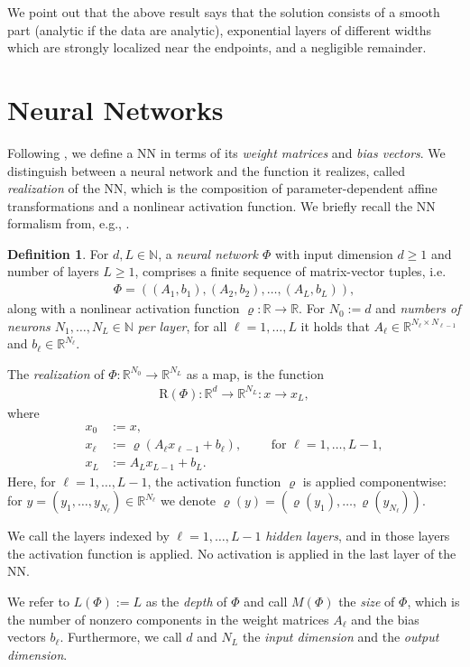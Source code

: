 \documentclass[11pt]{article}
\providecommand{\R}{\ensuremath{\mathbb{R}}}
\providecommand{\N}{\ensuremath{\mathbb{N}}}
\newcommand{\realiz}{\mathrm{R}}
\newcommand{\depth}{L}
\newcommand{\size}{M}
\theoremstyle{plain}
\theoremstyle{definition}
\newtheorem{definition}[theorem]{Definition}
\theoremstyle{remark}
\numberwithin{equation}{section}
\begin{document}
We point out that the above result says that the solution consists of a smooth part (analytic if the data are analytic), exponential layers of different widths which are strongly localized near the endpoints, and a negligible remainder. 


\section{Neural Networks}
\label{sec:nn}
Following  \cite{PV,OPS}, we define a NN in terms of its \emph{weight matrices} and \emph{bias vectors}.
We distinguish between a neural network and the function it realizes,
called \emph{realization} of the NN, which is the composition of parameter-dependent affine transformations
and a nonlinear activation function.
We briefly recall the NN formalism from, e.g., \cite{OPS}.
%

\begin{definition}
\label{def:NeuralNetworks}
For $d,L\in\N$, a \emph{neural network $\Phi$} 
with input dimension $d \geq 1$ and number of layers $L\geq 1$, 
comprises a finite sequence of matrix-vector tuples, i.e.
\begin{align*}
\Phi = ((A_1,b_1),(A_2,b_2),\ldots,(A_L,b_L)),
\end{align*}
along with a nonlinear activation function $\varrho : \mathbb{R} \rightarrow \mathbb{R}$.
%
For $N_0 := d$ and \emph{numbers of neurons $N_1,\ldots,N_L\in\N$ per layer}, 
for all $\ell=1,\ldots, L$ it holds that
$A_\ell\in\R^{N_\ell \times N_{\ell-1} }$ and
$b_\ell\in\R^{N_\ell}$.

The \emph{realization} of $\Phi:\R^{N_0} \to \R^{N_L}$ as a map, is the function
\begin{align*}
\realiz(\Phi): \R^d\to\R^{N_L} : x \to x_L,
\end{align*}
where
\begin{align*}
x_0 & := x,
\\
x_\ell & := \varrho( A_\ell x_{\ell-1} + b_\ell ),
\qquad\text{ for }\ell=1,\ldots,L-1,
\\
x_L & := A_L x_{L-1} + b_L.
\end{align*}
%
Here, for $\ell=1,\ldots,L-1$, the activation function
$\varrho$ is applied componentwise: for
$y = (y_1,\ldots,y_{N_\ell})\in\R^{N_\ell}$ we denote
$\varrho(y) = ( \varrho (y_1), \ldots,
\varrho (y_{N_\ell}) )$.

We call the layers indexed by $\ell=1,\ldots,L-1$ \emph{hidden layers}, and
in those layers the activation function is applied.  No
activation is applied in the last layer of the NN. 

We refer to $\depth(\Phi) := L$ as the \emph{depth} of $\Phi$
and call $\size(\Phi) $ the \emph{size} of $\Phi$,
which is the number of nonzero components 
in the weight matrices $A_\ell$ and the bias vectors $b_\ell$.
Furthermore, we call $d$ and $N_L$ the
\emph{input dimension} and the \emph{output dimension}.
\end{definition}
\end{document}
